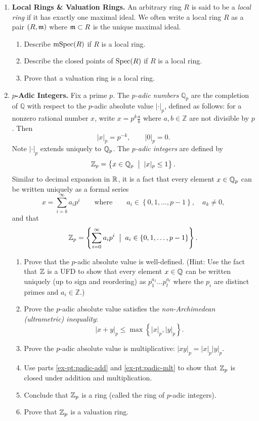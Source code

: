 \documentclass[12pt,reqno]{amsart}
\begin{document}
\begin{enumerate}[leftmargin=*]
\item \textbf{Local Rings \& Valuation Rings.} An arbitrary ring $R$ is said to be a \emph{local ring} if it has exactly one maximal ideal. We often write a local ring $R$ as a pair $(R,\mathfrak{m})$ where $\mathfrak{m} \subset R$ is the unique maximal ideal. 
\begin{enumerate}[label=(\alph*),ref=\theenumi\alph*]
	\item Describe $\operatorname{mSpec}(R)$ if $R$ is a local ring.
	\item Describe the closed points of $\operatorname{Spec}(R)$ if $R$ is a local ring. 
	\item Prove that a valuation ring is a local ring. 
\end{enumerate}

\item \textbf{$p$-Adic Integers.} Fix a prime $p$. The \emph{$p$-adic numbers} $\mathbb{Q}_p$ are the completion of $\mathbb{Q}$ with respect to the $p$-adic absolute value $|\cdot|_p$, defined as follows: for a nonzero rational number $x$, write $x = p^k \frac{a}{b}$ where $a,b \in \mathbb{Z}$ are not divisible by $p$. Then
\[
|x|_p = p^{-k}, \qquad |0|_p = 0.
\]
Note $|\cdot|_{p}$ extends uniquely to $\mathbb{Q}_{p}$. The \emph{$p$-adic integers} are defined by
\[
\mathbb{Z}_p = \left\{x \in \mathbb{Q}_p \;\; \big| \;\;  |x|_p \leq 1\right\}.
\]
Similar to decimal expansion in $\mathbb{R}$, it is a fact that every element $x \in \mathbb{Q}_p$ can be written uniquely as a formal series
\[
x = \sum_{i=k}^{\infty} a_i p^i  \quad \quad \text{where} \quad \quad a_i \in \left\{0,1,\dots,p-1\right\}, \quad a_k \neq 0,
\]
and that
\[
\mathbb{Z}_p = \left\{ \sum_{i=0}^{\infty} a_i p^i \;\; \big| \;\; a_i \in \{0,1,\dots,p-1\} \right\}.
\]
\begin{enumerate}[label=(\alph*),ref=\theenumi\alph*]
   \item Prove that the $p$-adic absolute value is well-defined. (Hint: Use the fact that $\mathbb{Z}$ is a UFD to show that every element $x\in \mathbb{Q}$ can be written uniquely (up to sign and reordering) as  $p_1^{a_1}\dots p_t^{a_t}$ where the $p_i$ are distinct primes and $a_i \in \mathbb Z$.)
    \item\label{ex-pt:padic-add} Prove the $p$-adic absolute value satisfies the \emph{non-Archimedean (ultrametric) inequality}:
    \[
    |x+y|_p \leq \max\left\{|x|_p, |y|_p\right \}.
    \]
    
    \item\label{ex-pt:padic-mlt}  Prove the $p$-adic absolute value is multiplicative: $|xy|_{p} = |x|_{p}|y|_{p}$.
    
    \item Use parts \ref{ex-pt:padic-add} and \ref{ex-pt:padic-mlt} to show that $\mathbb{Z}_p$ is closed under addition and multiplication.
    
    \item Conclude that $\mathbb{Z}_p$ is a ring (called the ring of $p$-adic integers).
    
    \item Prove that $\mathbb{Z}_{p}$ is a valuation ring. 
\end{enumerate}
\end{enumerate}
\end{document}

